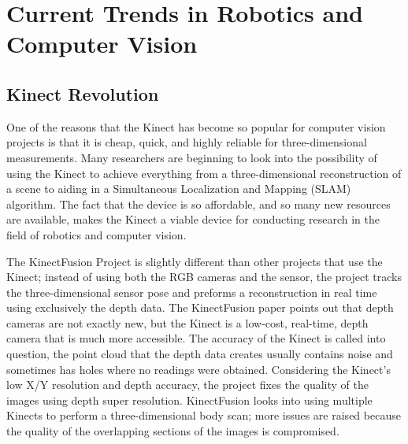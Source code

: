 \documentclass[pdftex,10.5pt]{report}
\begin{document}
\section{Current Trends in Robotics and Computer Vision}

\subsection{Kinect Revolution}
One of the reasons that the Kinect has become so popular for computer vision projects is that it is cheap, quick, and highly reliable for three-dimensional measurements. Many researchers are beginning to look into the possibility of using the Kinect to achieve everything from a three-dimensional reconstruction of a scene to aiding in a Simultaneous Localization and Mapping (SLAM) algorithm. The fact that the device is so affordable, and so many new resources are available, makes the Kinect a viable device for conducting research in the field of robotics and computer vision.

The KinectFusion Project is slightly different than other projects that use the Kinect; instead of using both the RGB cameras and the sensor, the project tracks the three-dimensional sensor pose and preforms a reconstruction in real time using exclusively the depth data. The KinectFusion paper points out that depth cameras are not exactly new, but the Kinect is a low-cost, real-time, depth camera that is much more accessible. The accuracy of the Kinect is called into question, the point cloud that the depth data creates usually contains noise and sometimes has holes where no readings were obtained. Considering the Kinect's low X/Y resolution and depth accuracy, the project fixes the quality of the images using depth super resolution. KinectFusion looks into using multiple Kinects to perform a three-dimensional body scan; more issues are raised because the quality of the overlapping sections of the images is compromised.
\end{document}
